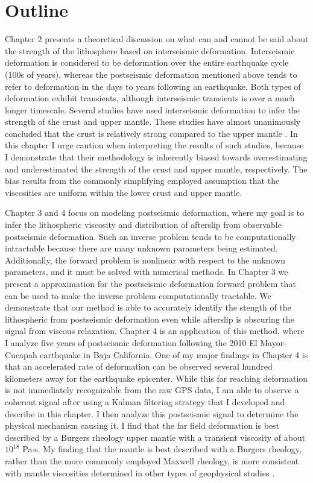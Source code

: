 \section{Outline}
Chapter 2 presents a theoretical discussion on what can and cannot be said about the strength of the lithosphere based on interseismic deformation. Interseismic deformation is considered to be deformation over the entire earthquake cycle (100s of years), whereas the postseismic deformation mentioned above tends to refer to deformation in the days to years following an earthquake. Both types of deformation exhibit transients, although interseismic transients is over a much longer timescale. Several studies have used interseismic deformation to infer the strength of the crust and upper mantle. These studies have almost unanimously concluded that the crust is relatively strong compared to the upper mantle \citep{Thatcher2008}. In this chapter I urge caution when interpreting the results of such studies, because I demonstrate that their methodology is inherently biased towards overestimating and underestimated the strength of the crust and upper mantle, respectively. The bias results from the commonly simplifying employed assumption that the viscosities are uniform within the lower crust and upper mantle. 

Chapter 3 and 4 focus on modeling postseismic deformation, where my goal is to infer the lithospheric viscosity and distribution of afterslip from observable postseismic deformation. Such an inverse problem tends to be computationally intractable because there are many unknown parameters being estimated. Additionally, the forward problem is nonlinear with respect to the unknown parameters, and it must be solved with numerical methods. In Chapter 3 we present a approximation for the postseismic deformation forward problem that can be used to make the inverse problem computationally tractable. We demonstrate that our method is able to accurately identify the stength of the lithospheric from postseismic deformation even while afterslip is obscuring the signal from viscous relaxation. Chapter 4 is an application of this method, where I analyze five years of postseismic deformation following the 2010 El Mayor-Cucapah earthquake in Baja California. One of my major findings in Chapter 4 is that an accelerated rate of deformation can be observed several hundred kilometers away for the earthquake epicenter. While this far reaching deformation is not immediately recognizable from the raw GPS data, I am able to observe a coherent signal after using a Kalman filtering strategy that I developed and describe in this chapter. I then analyze this postseismic signal to determine the physical mechanism causing it. I find that the far field deformation is best described by a Burgers rheology upper mantle with a transient viscosity of about $10^{18}$ Pa$\cdot$s. My finding that the mantle is best described with a Burgers rheology, rather than the more commonly employed Maxwell rheology, is more consistent with mantle viscosities determined in other types of geophysical studies \citep[e.g.,][]{Crittenden1967,Bills1987}.    

